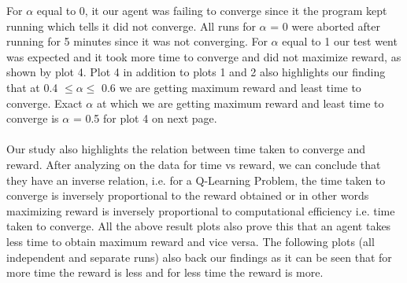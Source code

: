 \documentclass[conference]{IEEEtran}
\begin{document}
For $\alpha$ equal to 0, it our agent was failing to converge since it the program kept running which tells it did not converge. All runs for $\alpha$ = 0 were aborted after running for 5 minutes since it was not converging. For $\alpha$ equal to 1 our test went was expected and it took more time to converge and did not maximize reward, as shown by plot 4. Plot 4 in addition to plots 1 and 2 also highlights our finding that at 0.4 $ \leq \alpha \leq$ 0.6 we are getting maximum reward and least time to converge. Exact $\alpha$ at which we are getting maximum reward and least time to converge is $\alpha$ = 0.5 for plot 4 on next page. \\ \\ Our study also highlights the relation between time taken to converge and reward. After analyzing on the data for time vs reward, we can conclude that they have an inverse relation, i.e. for a Q-Learning Problem, the time taken to converge is inversely proportional to the reward obtained or in other words maximizing reward is inversely proportional to computational efficiency i.e. time taken to converge. All the above result plots also prove this that an agent takes less time to obtain maximum reward and vice versa. The following plots (all independent and separate runs) also back our findings as it can be seen that for more time the reward is less and for less time the reward is more. 
\end{document}
